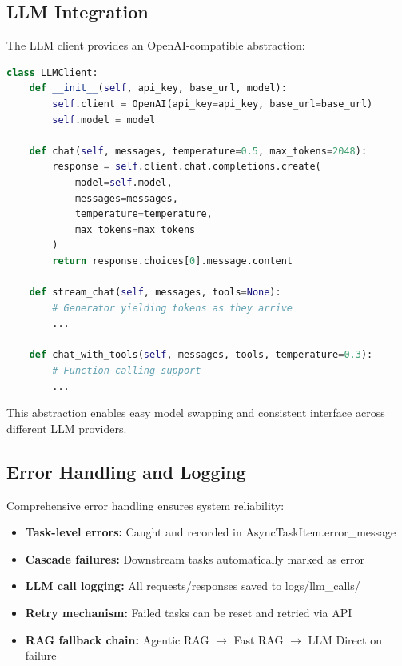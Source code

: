\subsection{LLM Integration}

The LLM client provides an OpenAI-compatible abstraction:

\begin{lstlisting}[language=Python, caption={LLM Client Interface}]
class LLMClient:
    def __init__(self, api_key, base_url, model):
        self.client = OpenAI(api_key=api_key, base_url=base_url)
        self.model = model
    
    def chat(self, messages, temperature=0.5, max_tokens=2048):
        response = self.client.chat.completions.create(
            model=self.model,
            messages=messages,
            temperature=temperature,
            max_tokens=max_tokens
        )
        return response.choices[0].message.content
    
    def stream_chat(self, messages, tools=None):
        # Generator yielding tokens as they arrive
        ...
    
    def chat_with_tools(self, messages, tools, temperature=0.3):
        # Function calling support
        ...
\end{lstlisting}

This abstraction enables easy model swapping and consistent interface across different LLM providers.

\subsection{Error Handling and Logging}

Comprehensive error handling ensures system reliability:

\begin{itemize}
    \item \textbf{Task-level errors:} Caught and recorded in AsyncTaskItem.error\_message
    \item \textbf{Cascade failures:} Downstream tasks automatically marked as error
    \item \textbf{LLM call logging:} All requests/responses saved to logs/llm\_calls/
    \item \textbf{Retry mechanism:} Failed tasks can be reset and retried via API
    \item \textbf{RAG fallback chain:} Agentic RAG $\to$ Fast RAG $\to$ LLM Direct on failure
\end{itemize}

